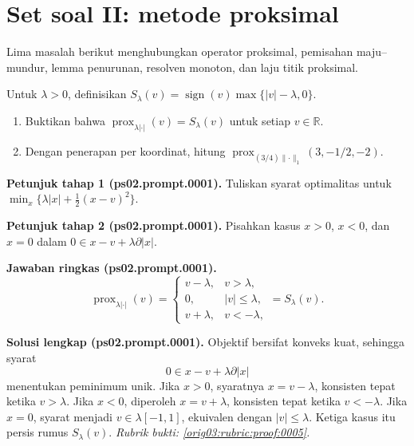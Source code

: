 
\section{Set soal II: metode proksimal}
\label{orig03:section:set-soal-metode-proksimal}

Lima masalah berikut menghubungkan operator proksimal, pemisahan
maju--mundur, lemma penurunan, resolven monoton, dan laju titik proksimal.

\begin{exercise}
\label{orig03:ps02:problem:0001}
Untuk $\lambda>0$, definisikan
$S_\lambda(v)=\operatorname{sign}(v)\max\{|v|-\lambda,0\}$.
\begin{enumerate}
\item\label{orig03:ps02:prompt:0001}
Buktikan bahwa $\operatorname{prox}_{\lambda|\cdot|}(v)=S_\lambda(v)$ untuk
setiap $v\in\mathbb{R}$.
\item\label{orig03:ps02:prompt:0002}
Dengan penerapan per koordinat, hitung
$\operatorname{prox}_{(3/4)\lVert\cdot\rVert_1}(3,-1/2,-2)$.
\end{enumerate}
\end{exercise}

\par\noindent\textbf{Petunjuk tahap 1 (ps02.prompt.0001).}
Tuliskan syarat optimalitas untuk
$\min_x\{\lambda|x|+\tfrac12(x-v)^2\}$.
\label{orig03:ps02:hint1:0001}
\par\noindent\textbf{Petunjuk tahap 2 (ps02.prompt.0001).}
Pisahkan kasus $x>0$, $x<0$, dan $x=0$ dalam
$0\in x-v+\lambda\partial|x|$.
\label{orig03:ps02:hint2:0001}
\par\noindent\textbf{Jawaban ringkas (ps02.prompt.0001).}
\[
 \operatorname{prox}_{\lambda|\cdot|}(v)=
 \begin{cases}
 v-\lambda,&v>\lambda,\\
 0,&|v|\leq\lambda,\\
 v+\lambda,&v<-\lambda,
 \end{cases}
 =S_\lambda(v).
\]
\label{orig03:ps02:answer:0001}
\par\noindent\textbf{Solusi lengkap (ps02.prompt.0001).}
Objektif bersifat konveks kuat, sehingga syarat
\[
 0\in x-v+\lambda\partial|x|
\]
menentukan peminimum unik. Jika $x>0$, syaratnya $x=v-\lambda$, konsisten
tepat ketika $v>\lambda$. Jika $x<0$, diperoleh $x=v+\lambda$, konsisten
tepat ketika $v<-\lambda$. Jika $x=0$, syarat menjadi
$v\in\lambda[-1,1]$, ekuivalen dengan $|v|\leq\lambda$. Ketiga kasus itu
persis rumus $S_\lambda(v)$.
\emph{Rubrik bukti: \ref{orig03:rubric:proof:0005}.}
\label{orig03:ps02:solution:0001}

